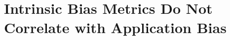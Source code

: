 \chapter{Intrinsic Bias Metrics Do Not Correlate with Application Bias}
\label{chapter:intrinsic_bias_metrics}